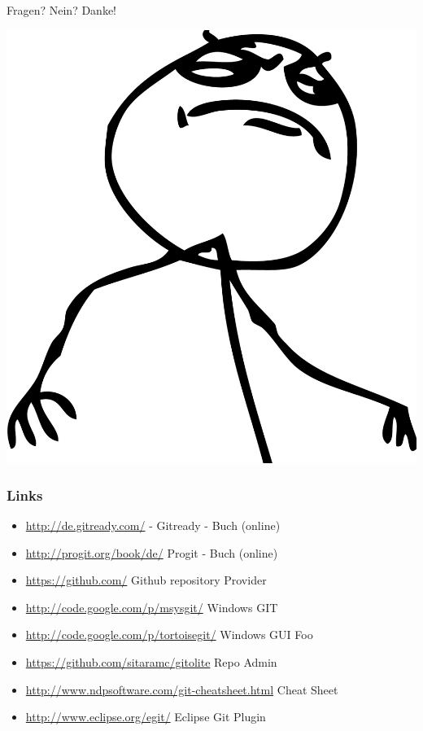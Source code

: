 \documentclass{beamer}
\begin{document}
			\begin{frame}
				Fragen? Nein? Danke!

				\begin{center}
					\includegraphics[height=0.4\textheight]{img/fuck-yeah}
				\end{center}
			\end{frame}

			\begin{frame}
				\frametitle{Links}

				\begin{itemize}
					\item{\url{http://de.gitready.com/} - Gitready - Buch (online)}
					\item{\url{http://progit.org/book/de/} Progit - Buch (online)}
					\item{\url{https://github.com/} Github repository Provider}
					\item{\url{http://code.google.com/p/msysgit/} Windows GIT}
					\item{\url{http://code.google.com/p/tortoisegit/} Windows GUI Foo}
					\item{\url{https://github.com/sitaramc/gitolite} Repo Admin}
					\item{\url{http://www.ndpsoftware.com/git-cheatsheet.html} Cheat Sheet}
					\item{\url{http://www.eclipse.org/egit/} Eclipse Git Plugin}
				\end{itemize}
			\end{frame}
\end{document}
